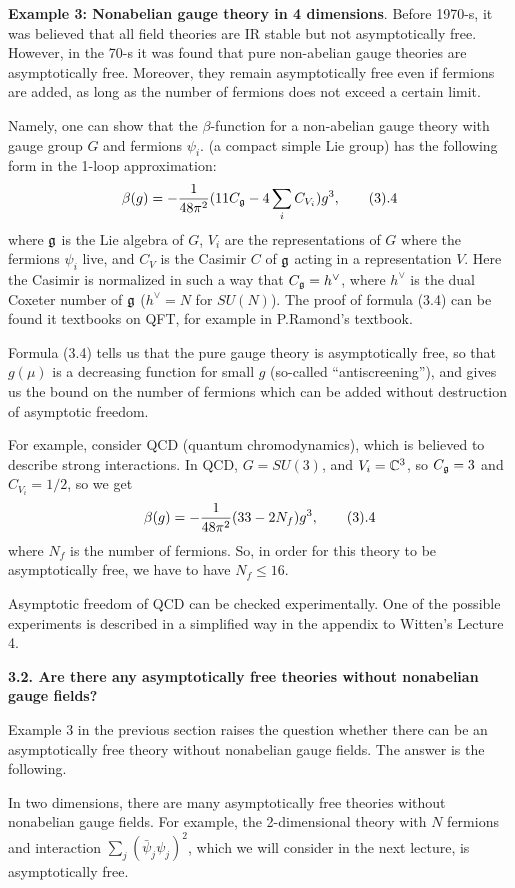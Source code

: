 {\bf Example 3: Nonabelian gauge theory in 4 dimensions}. 
Before 1970-s, it was believed that all field theories 
are IR stable but not asymptotically free. However, in the 70-s it was found 
that pure non-abelian gauge theories are asymptotically free. 
Moreover, they remain asymptotically free even if 
fermions are added, as long as the number of fermions
does not exceed a certain limit. 

Namely, one can show that the $\beta$-function
for a non-abelian gauge theory with gauge group $G$
and fermions $\psi_i$.  
(a compact simple Lie group) has the following form
in the 1-loop approximation:
$$
\beta(g)=-\frac{1}{48\pi^2}(11C_{\g}-4\sum_i C_{V_i})g^3,\tag 3.4
$$
where $\frak g$ is the Lie algebra of $G$, $V_i$ are the representations of $G$ 
where the fermions $\psi_i$ 
live, and $C_{V}$ is the Casimir $C$ of $\frak g$ acting 
in a representation $V$. Here the Casimir is normalized in such a way that
$C_{\frak g}=h^\vee$, where $h^\vee$ is the dual Coxeter number of $\frak g$
($h^\vee=N$ for $SU(N)$).  
The proof of formula (3.4) can be found it textbooks on QFT, for example
in P.Ramond's textbook. 

Formula (3.4) tells us that the pure gauge theory is asymptotically free,
so that $g(\mu)$ is a decreasing function for small $g$ 
(so-called ``antiscreening''), 
and gives us the bound on the number of fermions which can be added
without destruction of asymptotic freedom. 

For example, consider QCD (quantum chromodynamics), which is believed to
describe strong interactions. In QCD, $G=SU(3)$, and $V_i=\Bbb C^3$, 
so $C_{\frak g}=3$ and $C_{V_i}=1/2$, so we get
$$
\beta(g)=-\frac{1}{48\pi^2}(33-2N_f)g^3,\tag 3.4
$$
where $N_f$ is the number of fermions. So, in order for this theory 
to be asymptotically free, we have to have $N_f\le 16$. 

Asymptotic freedom of QCD can be checked experimentally. 
One of the possible experiments is described in a simplified way 
in the appendix to Witten's Lecture 4.  

{\bf 3.2. Are there any asymptotically free theories 
without nonabelian gauge fields?}

Example 3 in the previous section raises the question whether 
there can be an asymptotically free theory 
without nonabelian gauge fields. 
The answer is the following. 

In two dimensions, there are many asymptotically free theories without  
nonabelian gauge fields. For example, the 2-dimensional theory with 
$N$ fermions and interaction $\sum_j(\bar\psi_j\psi_j)^2$, which we will 
consider in the next lecture, is asymptotically free. 

